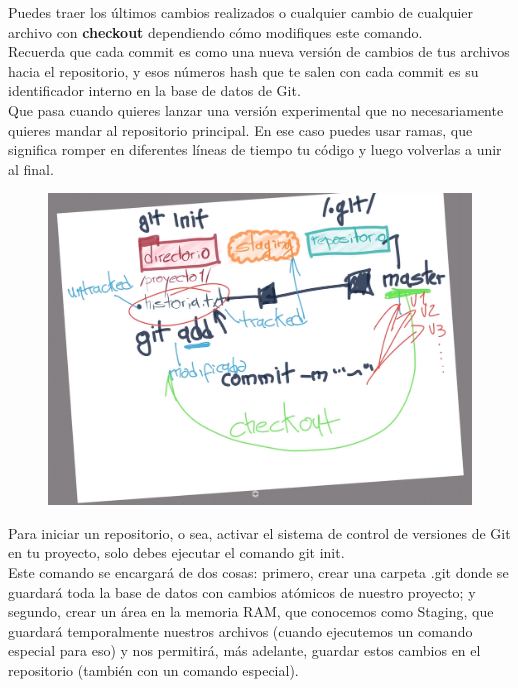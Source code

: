 \documentclass{article}
\begin{document}
Puedes traer los últimos cambios realizados o cualquier cambio de cualquier
archivo con \textbf{checkout} dependiendo cómo modifiques este comando.\\

Recuerda que cada commit es como una nueva versión de cambios de tus archivos
hacia el repositorio, y esos números hash que te salen con cada commit es su
identificador interno en la base de datos de Git.\\

Que pasa cuando quieres lanzar una versión experimental que no necesariamente
quieres mandar al repositorio principal. En ese caso puedes usar ramas, que
significa romper en diferentes líneas de tiempo tu código y luego volverlas a
unir al final.

\begin{figure}[h!]
  \centering
  \includegraphics[scale=0.5]{./Pictures/068_ciclo_basico.png}
\end{figure}

Para iniciar un repositorio, o sea, activar el sistema de control de versiones
de Git en tu proyecto, solo debes ejecutar el comando git init.\\


Este comando se encargará de dos cosas: primero, crear una carpeta .git donde
se guardará toda la base de datos con cambios atómicos de nuestro proyecto; y
segundo, crear un área en la memoria RAM, que conocemos como Staging, que
guardará temporalmente nuestros archivos (cuando ejecutemos un comando especial
para eso) y nos permitirá, más adelante, guardar estos cambios en el
repositorio (también con un comando especial).\\
\end{document}
